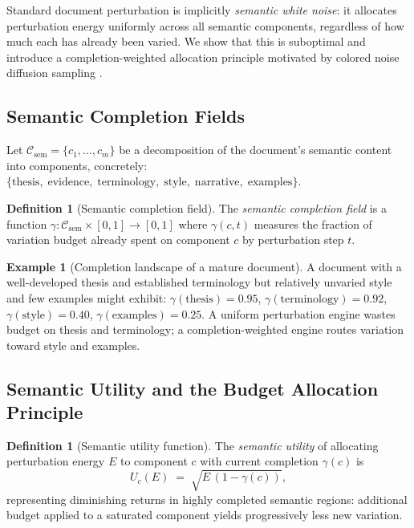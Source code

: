 \documentclass[12pt, a4paper]{article}
\theoremstyle{plain}
\theoremstyle{definition}
\newtheorem{definition}[theorem]{Definition}
\newtheorem{example}[theorem]{Example}
\theoremstyle{remark}
\begin{document}
Standard document perturbation is implicitly \emph{semantic white noise}: it
allocates perturbation energy uniformly across all semantic components,
regardless of how much each has already been varied.  We show that this is
suboptimal and introduce a completion-weighted allocation principle motivated
by colored noise diffusion sampling
\cite{davidson2026colorednoisediffusionsampling}.

\subsection{Semantic Completion Fields}

Let $\mathcal{C}_{\mathrm{sem}} = \{c_1, \ldots, c_m\}$ be a decomposition of
the document's semantic content into components, concretely:
$\{\text{thesis},\; \text{evidence},\; \text{terminology},\;
  \text{style},\; \text{narrative},\; \text{examples}\}$.

\begin{definition}[Semantic completion field]
\label{def:completion}
The \emph{semantic completion field} is a function
$\gamma : \mathcal{C}_{\mathrm{sem}} \times [0,1] \to [0,1]$
where $\gamma(c, t)$ measures the fraction of variation budget already spent on
component $c$ by perturbation step $t$.
\end{definition}

\begin{example}[Completion landscape of a mature document]
A document with a well-developed thesis and established terminology but
relatively unvaried style and few examples might exhibit:
$\gamma(\text{thesis}) = 0.95$, $\gamma(\text{terminology}) = 0.92$,
$\gamma(\text{style}) = 0.40$, $\gamma(\text{examples}) = 0.25$.
A uniform perturbation engine wastes budget on thesis and terminology;
a completion-weighted engine routes variation toward style and examples.
\end{example}

\subsection{Semantic Utility and the Budget Allocation Principle}

\begin{definition}[Semantic utility function]
\label{def:utility}
The \emph{semantic utility} of allocating perturbation energy $E$ to component
$c$ with current completion $\gamma(c)$ is
\[
   U_c(E) \;=\; \sqrt{E\,(1 - \gamma(c))},
\]
representing diminishing returns in highly completed semantic regions: additional
budget applied to a saturated component yields progressively less new variation.
\end{definition}
\end{document}
